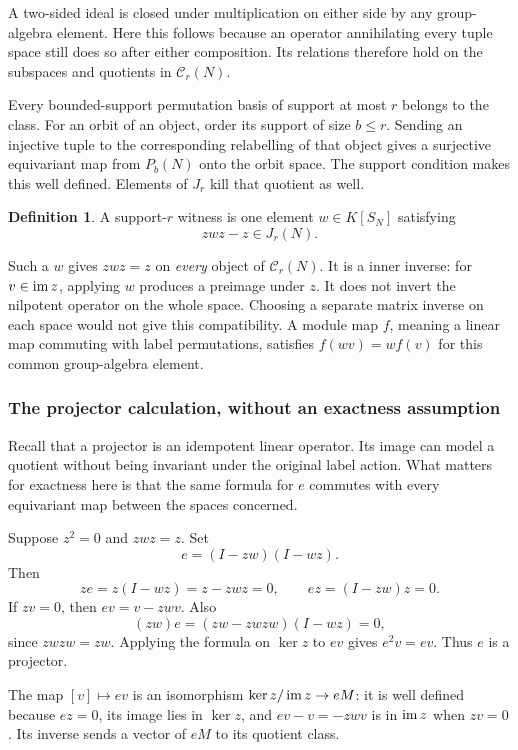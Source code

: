 \documentclass[11pt,a4paper]{article}
\theoremstyle{definition}\newtheorem{definition}[theorem]{Definition}
\theoremstyle{remark}\newtheorem{remark}[theorem]{Remark}
\begin{document}
A two-sided ideal is closed under multiplication on either side by
any group-algebra element. Here this follows because an operator
annihilating every tuple space still does so after either composition.
Its relations therefore hold on the subspaces and quotients in
$\mathcal C_r(N)$.

Every bounded-support permutation basis of support at most $r$ belongs to the class. For an orbit of an object, order its support of size $b\le r$. Sending an injective tuple to the corresponding relabelling of that object gives a surjective equivariant map from $P_b(N)$ onto the orbit space. The support condition makes this well defined. Elements of $J_r$ kill that quotient as well.

\begin{definition}
A support-$r$ witness is one element $w\in K[S_N]$ satisfying
\begin{equation}\label{eq:witness2}zwz-z\in J_r(N).
\end{equation}
\end{definition}
Such a $w$ gives $zwz=z$ on \emph{every} object of $\mathcal C_r(N)$. It is a inner inverse: for $v\in\operatorname{im} z$, applying $w$ produces a preimage under $z$. It does not invert the nilpotent operator on the whole space. Choosing a separate matrix inverse on each space would not give this compatibility. A module map $f$, meaning a linear map commuting with label permutations, satisfies $f(wv)=w f(v)$ for this common group-algebra element.

\subsubsection{The projector calculation, without an exactness assumption}
Recall that a projector is an idempotent linear operator. Its image
can model a quotient without being invariant under the original label
action. What matters for exactness here is that the same formula for
$e$ commutes with every equivariant map between the spaces concerned.

Suppose $z^2=0$ and $zwz=z$. Set
\[e=(I-zw)(I-wz).\]
Then
\[ze=z(I-wz)=z-zwz=0,\qquad ez=(I-zw)z=0.\]
If $zv=0$, then $ev=v-zwv$. Also
\[(zw)e=(zw-zwzw)(I-wz)=0,\]
since $zwzw=zw$. Applying the formula on $\ker z$ to $ev$ gives $e^2v=ev$. Thus $e$ is a projector.

The map $[v]\mapsto ev$ is an isomorphism $\ker z/\operatorname{im} z\to eM$: it is well defined because $ez=0$, its image lies in $\ker z$, and $ev-v=-zwv$ is in $\operatorname{im} z$ when $zv=0$. Its inverse sends a vector of $eM$ to its quotient class.
\end{document}
